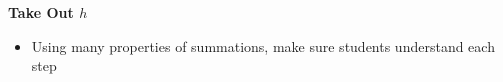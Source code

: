 \item \textbf{Take Out $h$}
\begin{itemize}
\item Using many properties of summations, make sure students understand each step
\end{itemize}